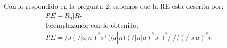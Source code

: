 \documentclass[spanish, fleqn]{article}
\begin{document}
\begin{enumerate}
    Con lo respondido en la pregunta 2, sabemos que la RE esta descrita por:
    \begin{align*}
    &RE=R_5|R_7\\
    &\text{Reemplazando con lo obtenido:}\\
    &RE=/s(/|a|n)^*s^+((a|n)(/|n|a)^*s^+)^*/|//(/|s|a)^*n
    \end{align*}
  \end{enumerate}
\end{document}
